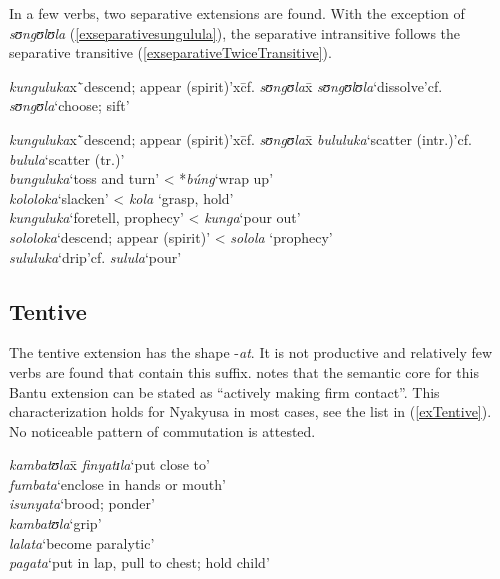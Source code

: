 In a few verbs, two separative extensions are found. With the exception of \textit{sʊngʊlʊla} (\ref{exseparativesungulula}), the separative intransitive follows the separative transitive (\ref{exseparativeTwiceTransitive}).
\begin{exe}
\ex \label{exseparativesungulula}
\begin{tabbing}
\textit{kunguluka}x\=`descend; appear (spirit)'x\=cf. \textit{sʊngʊla}x\=\kill%
\textit{sʊngʊlʊla}\>`dissolve'\>cf. \textit{sʊngʊla}\>`choose; sift'
\end{tabbing}
\ex \label{exseparativeTwiceTransitive}
\begin{tabbing}
\textit{kunguluka}x\=`descend; appear (spirit)'x\=cf. \textit{sʊngʊla}x\=\kill%
\textit{bululuka}\>`scatter (intr.)'\>cf. \textit{bulula}\>`scatter (tr.)'\\
\textit{bunguluka}\>`toss and turn'\> < *\textit{búng}\>`wrap up'\\
\textit{kololoka}\>`slacken'\> < \textit{kola}\> \lq grasp, hold'\\
\textit{kunguluka}\>`foretell, prophecy'\> < \textit{kunga}\>`pour out'\\
\textit{sololoka}\>`descend; appear (spirit)'\> < \textit{solola} \>`prophecy'\\
\textit{sululuka}\>`drip'\>cf. \textit{sulula}\>`pour'
\end{tabbing}
\end{exe}
\subsection{Tentive}
The tentive extension has the shape -\textit{at}. It is not productive and relatively few verbs are found that contain this suffix. \citet[77]{SchadebergT2003a} notes that the semantic core for this Bantu extension can be stated as ``actively making firm contact''. This characterization holds for Nyakyusa in most cases, see the list in (\ref{exTentive}). No noticeable pattern of commutation is attested.
 
\begin{exe}
\ex \label{exTentive}
\begin{tabbing}
\textit{kambatʊla}x\=\kill 
\textit{finyatɪla}\>`put close to'\\
\textit{fumbata}\>`enclose in hands or mouth'\\
\textit{isunyata}\>`brood; ponder'\\
\textit{kambatʊla}\>`grip'\\
\textit{lalata}\>`become paralytic' \\
\textit{pagata}\>`put in lap, pull to chest; hold child'
\end{tabbing}
\end{exe}
